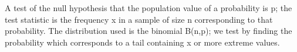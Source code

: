  A test of the null hypothesis that the population value of
a probability is p; the test statistic is the frequency x in a
sample of size n corresponding to that probability. The distribution
used is the binomial B(n,p); we test by finding the probability
which corresponds to a tail containing x or more extreme values.

